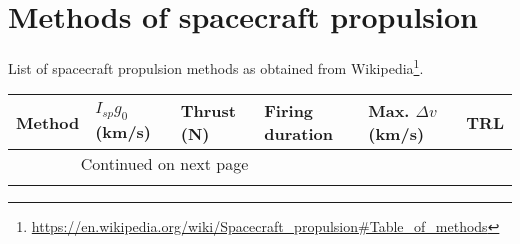 \chapter{Methods of spacecraft propulsion} \label{sec:methodstable}

List of spacecraft propulsion methods as obtained from Wikipedia\footnote{\url{https://en.wikipedia.org/wiki/Spacecraft\_propulsion\#Table\_of\_methods}}.

\begin{landscape}

\begin{longtable}{lllllr}
\toprule
                                            Method &    $I_{sp} g_0$ (km/s) &       Thrust (N) &         Firing duration & Max. $\Delta v$ (km/s) &  TRL \\
\midrule
\endhead
\midrule
\multicolumn{3}{r}{{Continued on next page}} \\
\midrule
\endfoot


\end{longtable}
\end{landscape}
